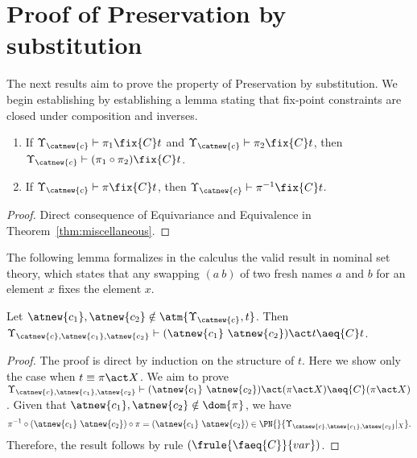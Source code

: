 \section{Proof of Preservation by substitution}\label{app:preservation-substitutiton}

The next results aim to prove the property of Preservation by substitution. We begin establishing by establishing a lemma stating that fix-point constraints are closed under composition and inverses.

\begin{lemma}\label{alemma:fix-point-composition-inverse}
    \begin{enumerate}
        \item \label{alemma:fix-point-composition} If $\Upsilon_{\catnew{c}} \vdash \pi_1 \fix{C} t$  and $\Upsilon_{\catnew{c}} \vdash \pi_2 \fix{C} t$, then $\Upsilon_{\catnew{c}} \vdash (\pi_1\circ \pi_2) \fix{C} t$.
        \item \label{alemma:fix-point-inverse} If $\Upsilon_{\catnew{c}} \vdash \pi\fix{C} t$, then  $\Upsilon_{\catnew{c}} \vdash \pi^{-1}\fix{C} t$.
    \end{enumerate}
\end{lemma}

\begin{proof}
Direct consequence of Equivariance and Equivalence in Theorem~\ref{thm:miscellaneous}.
\end{proof}

The following lemma formalizes in the calculus the valid result in nominal set theory, which states that any swapping $(a \ b)$ of two fresh names $a$ and $b$ for an element $x$ fixes the element $x$.

\begin{lemma}\label{alemma:two-fresh-names-fix}
    Let $\atnew{c_1},\atnew{c_2}\notin \atm{\Upsilon_{\catnew{c}},t}$. Then  $\Upsilon_{\catnew{c},\atnew{c_1},\atnew{c_2}} \vdash (\atnew{c_1} \ \atnew{c_2})\act t \aeq{C} t$.
\end{lemma}


\begin{proof}
The proof is direct by induction on the structure of $t$. Here we show only the case when $t\equiv \pi\act X$. We aim to prove $\Upsilon_{\catnew{c},\atnew{c_1},\atnew{c_2}} \vdash (\atnew{c_1} \ \atnew{c_2}) \act (\pi\act X) \aeq{C} (\pi\act X)$. Given that $\atnew{c_1},\atnew{c_2} \notin \dom{\pi}$, we have
     \[
         \pi^{-1}\circ(\atnew{c_1} \ \atnew{c_2})\circ\pi = (\atnew{c_1} \ \atnew{c_2})\in \PN{}{\Upsilon_{\catnew{c},\atnew{c_1},\atnew{c_2}}|_X}.
     \]
     Therefore, the result follows by rule $(\frule{\faeq{C}}{var})$.
\end{proof}


